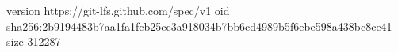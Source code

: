 version https://git-lfs.github.com/spec/v1
oid sha256:2b9194483b7aa1fa1fcb25cc3a918034b7bb6cd4989b5f6ebe598a438bc8ce41
size 312287
